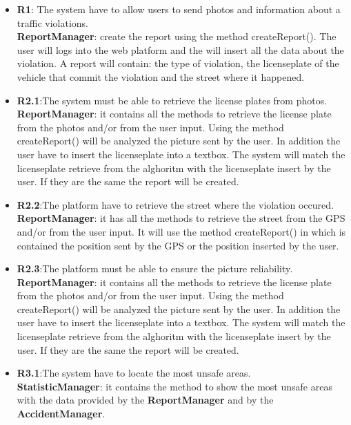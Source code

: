 \begin{itemize}
	\item
	\textbf{R1}: The system have to allow users to send photos and information about a traffic violations. \\
	\textbf{ReportManager}: create the report using the method createReport(). The user will logs into the web platform and the will insert all the data about the violation.  A report will contain: the type of violation, the licenseplate of the vehicle that commit the violation and the street where it happened.
	
	\item 
	\textbf{R2.1}:The system must be able to retrieve the license plates from photos. \\
	\textbf{ReportManager}: it contains all the methods to retrieve the license plate from the photos and/or from the user input. Using the method createReport() will be analyzed the picture sent by the user. In addition the user have to insert the licenseplate into a textbox. The system will match the licenseplate retrieve from the alghoritm with the licenseplate insert by the user. If they are the same the report will be created.
	
	\item 
	\textbf{R2.2}:The platform have to retrieve the street where the violation occured. \\
	\textbf{ReportManager}: it has all the methods to retrieve the street from the GPS and/or from the user input. It will use the method createReport() in which is contained the position sent by the GPS or the position inserted by the user.
	
	\item 
	\textbf{R2.3}:The platform must be able to ensure the picture reliability. \\
	\textbf{ReportManager}: it contains all the methods to retrieve the license plate from the photos and/or from the user input. Using the method createReport() will be analyzed the picture sent by the user. In addition the user have to insert the licenseplate into a textbox. The system will match the licenseplate retrieve from the alghoritm with the licenseplate insert by the user. If they are the same the report will be created.
	
	\item 
	\textbf{R3.1}:The system have to locate the most unsafe areas. \\
	\textbf{StatisticManager}: it contains the method to show the most unsafe areas with the data provided by the \textbf{ReportManager} and by the \textbf{AccidentManager}.
	

\end{itemize}
